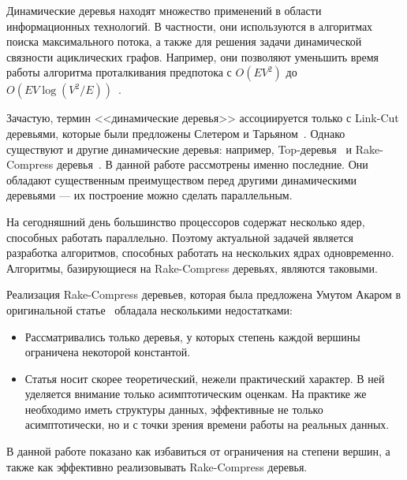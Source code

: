 \startprefacepage

Динамические деревья находят множество применений в области информационных технологий. В частности, они используются в 
алгоритмах поиска максимального потока, а также для решения задачи динамической 
связности ациклических графов. Например, они позволяют уменьшить время работы алгоритма проталкивания
предпотока с $O(EV^2)$ до $O(EV \log (V^2 / E))$~\cite{tarj86}. 

Зачастую, термин <<динамические деревья>> ассоциируется только с Link-Cut деревьями, которые были предложены 
Слетером и Тарьяном~\cite{tarj83}. Однако существуют и другие динамические деревья: например, Top-деревья~\cite{alst05} и Rake-Compress деревья~\cite{acar04, acar05}.
В данной работе рассмотрены именно последние. Они обладают существенным преимуществом перед другими динамическими 
деревьями --- их построение можно сделать параллельным.

На сегодняшний день большинство процессоров содержат несколько ядер, способных работать параллельно. 
Поэтому актуальной задачей является разработка алгоритмов, способных работать на нескольких ядрах одновременно.
Алгоритмы, базирующиеся на Rake-Compress деревьях, являются таковыми.

Реализация Rake-Compress деревьев, которая была предложена Умутом Акаром в оригинальной статье~\cite{acar04} обладала несколькими недостатками:
\begin{itemize}
\item Рассматривались только деревья, у которых степень каждой вершины ограничена некоторой константой. 
\item Статья носит скорее теоретический, нежели практический характер. В ней уделяется внимание только асимптотическим оценкам. 
На практике же необходимо иметь структуры данных, эффективные не только асимптотически, но и с точки зрения времени работы на реальных данных. 
\end{itemize}

В данной работе показано как избавиться от ограничения на степени вершин, а также как эффективно реализовывать Rake-Compress деревья.

\FloatBarrier
